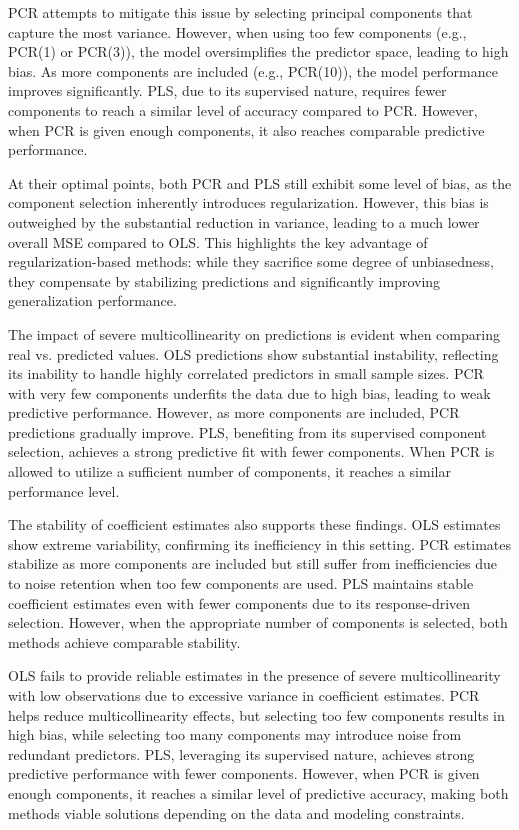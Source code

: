 \documentclass[11pt,twoside,a4paper]{article}
\begin{document}
PCR attempts to mitigate this issue by selecting principal components that capture the most variance. However, when using too few components (e.g., PCR(1) or PCR(3)), the model oversimplifies the predictor space, leading to high bias. As more components are included (e.g., PCR(10)), the model performance improves significantly. PLS, due to its supervised nature, requires fewer components to reach a similar level of accuracy compared to PCR. However, when PCR is given enough components, it also reaches comparable predictive performance. 

At their optimal points, both PCR and PLS still exhibit some level of bias, as the component selection inherently introduces regularization. However, this bias is outweighed by the substantial reduction in variance, leading to a much lower overall MSE compared to OLS. This highlights the key advantage of regularization-based methods: while they sacrifice some degree of unbiasedness, they compensate by stabilizing predictions and significantly improving generalization performance.

The impact of severe multicollinearity on predictions is evident when comparing real vs. predicted values. OLS predictions show substantial instability, reflecting its inability to handle highly correlated predictors in small sample sizes. PCR with very few components underfits the data due to high bias, leading to weak predictive performance. However, as more components are included, PCR predictions gradually improve. PLS, benefiting from its supervised component selection, achieves a strong predictive fit with fewer components. When PCR is allowed to utilize a sufficient number of components, it reaches a similar performance level.

The stability of coefficient estimates also supports these findings. OLS estimates show extreme variability, confirming its inefficiency in this setting. PCR estimates stabilize as more components are included but still suffer from inefficiencies due to noise retention when too few components are used. PLS maintains stable coefficient estimates even with fewer components due to its response-driven selection. However, when the appropriate number of components is selected, both methods achieve comparable stability.

OLS fails to provide reliable estimates in the presence of severe multicollinearity with low observations due to excessive variance in coefficient estimates. PCR helps reduce multicollinearity effects, but selecting too few components results in high bias, while selecting too many components may introduce noise from redundant predictors. PLS, leveraging its supervised nature, achieves strong predictive performance with fewer components. However, when PCR is given enough components, it reaches a similar level of predictive accuracy, making both methods viable solutions depending on the data and modeling constraints.
\end{document}
